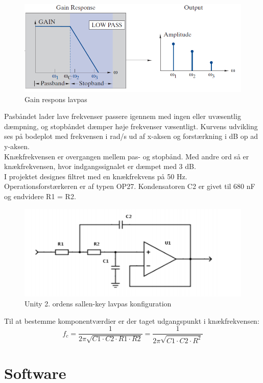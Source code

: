 \begin{figure}[H]
\centering
\includegraphics[scale=0.50]{lavpas.PNG}
\caption{Gain respons lavpas}
\end{figure}

Pasbåndet lader lave frekvenser passere igennem med ingen eller uvæsentlig dæmpning, og stopbåndet dæmper høje frekvenser væsentligt. Kurvens udvikling ses på bodeplot med frekvensen i rad/s ud af x-aksen og forstærkning i dB op ad y-aksen. \\
\newline
Knækfrekvensen er overgangen mellem pas- og stopbånd. Med andre ord så er knækfrekvensen, hvor indgangssignalet er dæmpet med 3 dB. \\
\newline
I projektet designes filtret med en knækfrekvens på 50 Hz. Operationsforstærkeren er af typen OP27. Kondensatoren C2 er givet til 680 nF og endvidere R1 = R2. 

\begin{figure}[H]
\centering
\includegraphics[scale=0.60]{opamp.PNG}
\caption{Unity 2. ordens sallen-key lavpas konfiguration}
\end{figure}

Til at bestemme komponentværdier er der taget udgangspunkt i knækfrekvensen:
$$f_c=\frac{1}{2 \pi \sqrt{C1 \cdot C2 \cdot R1 \cdot R2}} = \frac{1}{2 \pi \sqrt{C1 \cdot C2 \cdot R^2}}$$

\section{Software}

